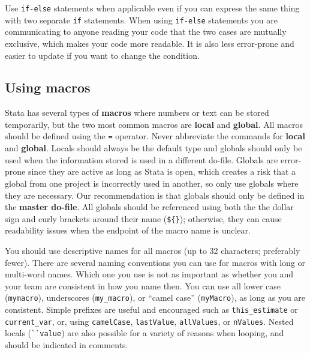 
\noindent Use \texttt{if-else} statements when applicable
even if you can express the same thing with two separate \texttt{if} statements.
When using \texttt{if-else} statements you are communicating to anyone reading your code
that the two cases are mutually exclusive, which makes your code more readable.
It is also less error-prone and easier to update if you want to change the condition.


\subsection{Using macros}

Stata has several types of \textbf{macros} where numbers or text can be stored temporarily,
but the two most common macros are \textbf{local} and \textbf{global}.
All macros should be defined using the \texttt{=} operator.
Never abbreviate the commands for \textbf{local} and \textbf{global}.
Locals should always be the default type and globals should only
be used when the information stored is used in a different do-file.
Globals are error-prone since they are active as long as Stata is open,
which creates a risk that a global from one project is incorrectly used in another,
so only use globals where they are necessary.
Our recommendation is that globals should only be defined in the \textbf{master do-file}.
All globals should be referenced using both the the dollar sign and curly brackets around their name (\texttt{\$\{\}});
otherwise, they can cause readability issues when the endpoint of the macro name is unclear.

You should use descriptive names for all macros (up to 32 characters; preferably fewer).
There are several naming conventions you can use for macros with long or multi-word names.
Which one you use is not as important as whether you and your team are consistent in how you name then.
You can use all lower case (\texttt{mymacro}), underscores (\texttt{my\_macro}),
or ``camel case'' (\texttt{myMacro}), as long as you are consistent.
Simple prefixes are useful and encouraged such as \texttt{this\_estimate} or \texttt{current\_var},
or, using \texttt{camelCase}, \texttt{lastValue}, \texttt{allValues}, or \texttt{nValues}.
Nested locals (\texttt{\`{}\`{}value\textquotesingle\textquotesingle})
are also possible for a variety of reasons when looping, and should be indicated in comments.

